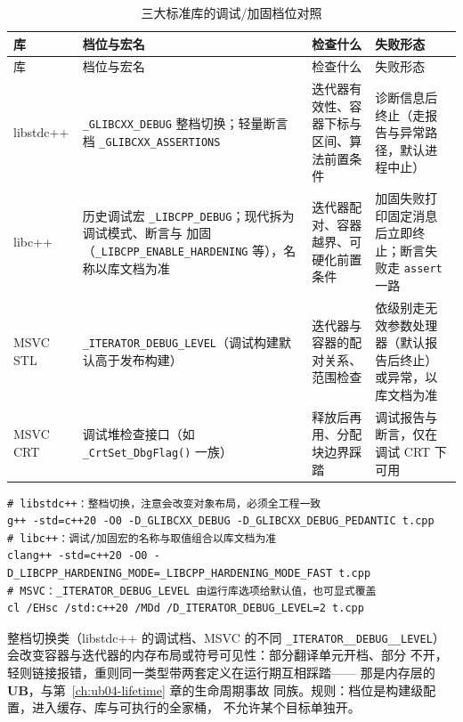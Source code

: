 \documentclass[12pt,a4paper,fontset=fandol]{ctexbook}
\newcommand{\Fn}[1]{\texttt{#1()}}
\newcommand{\Tp}[1]{\texttt{#1}}
\newcommand{\Bk}{\discretionary{}{}{}}
\newcommand{\UB}{\textbf{\textsf{UB}}}
\newcommand{\Feat}[1]{\texttt{#1}}
\begin{document}
\begin{longtable}{@{}>{\raggedright\arraybackslash}p{} >{\raggedright\arraybackslash}p{} >{\raggedright\arraybackslash}p{} >{\raggedright\arraybackslash}p{}@{}}
\caption{三大标准库的调试/加固档位对照}\label{tab:ub14-tiers}\\
\toprule
库 & 档位与宏名 & 检查什么 & 失败形态 \\
\midrule
\endfirsthead
\toprule
库 & 档位与宏名 & 检查什么 & 失败形态 \\
\midrule
\endhead
\bottomrule
\endfoot
libstdc++ &
\Feat{\_GLIBCXX{\Bk}\_DEBUG} 整档切换；轻量断言档
\Feat{\_GLIBCXX{\Bk}\_ASSERTIONS} &
迭代器有效性、容器下标与区间、算法前置条件 &
诊断信息后终止（走报告与异常路径，默认进程中止） \\
\addlinespace
libc++ &
历史调试宏 \Feat{\_LIBCPP{\Bk}\_DEBUG}；现代拆为调试模式、断言与
加固（\Feat{\_LIBCPP{\Bk}\_ENABLE{\Bk}\_HARDENING} 等），名称以库文档为准 &
迭代器配对、容器越界、可硬化前置条件 &
加固失败打印固定消息后立即终止；断言失败走 \Tp{assert} 一路 \\
\addlinespace
MSVC STL &
\Feat{\_ITERATOR{\Bk}\_DEBUG{\Bk}\_LEVEL}（调试构建默认高于发布构建）&
迭代器与容器的配对关系、范围检查 &
依级别走无效参数处理器（默认报告后终止）或异常，以库文档为准 \\
\addlinespace
MSVC CRT &
调试堆检查接口（如 \Fn{\_CrtSet{\Bk}\_DbgFlag} 一族）&
释放后再用、分配块边界踩踏 &
调试报告与断言，仅在调试 CRT 下可用 \\
\end{longtable}

\begin{lstlisting}[style=shellstyle, caption={同一段代码在三种档位下的编译方式}]
# libstdc++：整档切换，注意会改变对象布局，必须全工程一致
g++ -std=c++20 -O0 -D_GLIBCXX_DEBUG -D_GLIBCXX_DEBUG_PEDANTIC t.cpp
# libc++：调试/加固宏的名称与取值组合以库文档为准
clang++ -std=c++20 -O0 -D_LIBCPP_HARDENING_MODE=_LIBCPP_HARDENING_MODE_FAST t.cpp
# MSVC：_ITERATOR_DEBUG_LEVEL 由运行库选项给默认值，也可显式覆盖
cl /EHsc /std:c++20 /MDd /D_ITERATOR_DEBUG_LEVEL=2 t.cpp
\end{lstlisting}

\begin{warning}[title=调试档位改变对象布局，混档链接是事故源]
整档切换类（libstdc++ 的调试档、MSVC 的不同 \Feat{\_ITERATOR\_\Bk\_DEBUG\_\Bk\_LEVEL}）
会改变容器与迭代器的内存布局或符号可见性：部分翻译单元开档、部分
不开，轻则链接报错，重则同一类型带两套定义在运行期互相踩踏——
那是内存层的 \UB{}，与第~\ref{ch:ub04-lifetime} 章的生命周期事故
同族。规则：档位是构建级配置，进入缓存、库与可执行的全家桶，
不允许某个目标单独开。
\end{warning}
\end{document}
